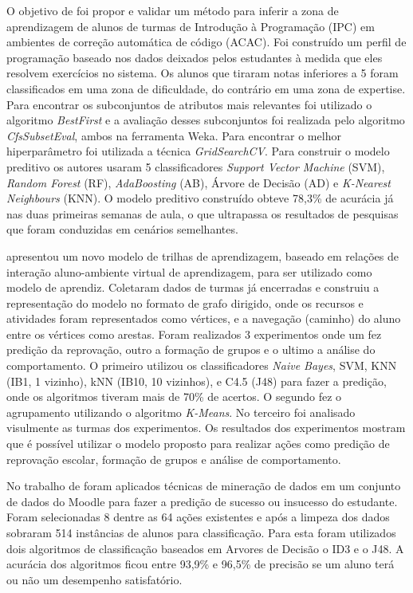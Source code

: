 \documentclass[ti]{texufpel} %
\begin{document}
O objetivo de \citet{dwan2017prediccao} foi propor e validar um método para inferir a zona de aprendizagem de alunos de turmas de Introdução à Programação (IPC) em ambientes de correção automática de código (ACAC). Foi construído um perfil de programação baseado nos dados deixados pelos estudantes à medida que eles resolvem exercícios no sistema. Os alunos que tiraram notas inferiores a 5 foram classificados em uma zona de dificuldade, do contrário em uma zona de expertise. Para encontrar os subconjuntos de atributos mais relevantes foi utilizado o algoritmo \textit{BestFirst} e a avaliação desses subconjuntos foi realizada pelo algoritmo \textit{CfsSubsetEval}, ambos na ferramenta Weka.  Para encontrar o melhor hiperparâmetro foi utilizada a técnica \textit{GridSearchCV}. Para construir o modelo preditivo os autores usaram 5 classificadores \textit{Support Vector Machine} (SVM), \textit{Random Forest} (RF), \textit{AdaBoosting} (AB), Árvore de Decisão (AD) e \textit{K-Nearest Neighbours} (KNN). O modelo preditivo construído obteve 78,3\% de acurácia já nas duas primeiras semanas de aula, o que ultrapassa os resultados de pesquisas que foram conduzidas em cenários semelhantes.

\citet{ramos2017modelo} apresentou um novo modelo de trilhas de aprendizagem, baseado em relações de interação aluno-ambiente virtual de aprendizagem, para ser utilizado como modelo de aprendiz. Coletaram dados de turmas já encerradas e construiu a representação do modelo no formato de grafo dirigido, onde os recursos e atividades foram representados como vértices, e a navegação (caminho) do aluno entre os vértices como arestas. Foram realizados 3 experimentos onde um fez predição da reprovação, outro a formação de grupos e o ultimo a análise do comportamento. O primeiro utilizou os classificadores \textit{Naive Bayes}, SVM, KNN (IB1, 1 vizinho), kNN (IB10, 10 vizinhos), e C4.5 (J48) para fazer a predição, onde os algoritmos tiveram mais de 70\% de acertos. O segundo fez o agrupamento utilizando o algoritmo \textit{K-Means}.  No terceiro foi analisado visulmente as turmas dos experimentos. Os resultados dos experimentos mostram que é possível utilizar o modelo proposto para realizar ações como predição de reprovação escolar, formação de grupos e análise de comportamento.

No trabalho de \citet{rabelo2017utilizaccao} foram aplicados técnicas de mineração de dados em um conjunto de dados do Moodle para fazer a predição de sucesso ou insucesso do estudante. Foram selecionadas 8 dentre as 64 ações existentes e após a limpeza dos dados sobraram 514 instâncias de alunos para classificação. Para esta foram utilizados dois algoritmos de classificação baseados em Arvores de Decisão o ID3 e o J48. A acurácia dos algoritmos ficou entre 93,9\% e 96,5\% de precisão se um aluno terá ou não um desempenho satisfatório.
\end{document}
